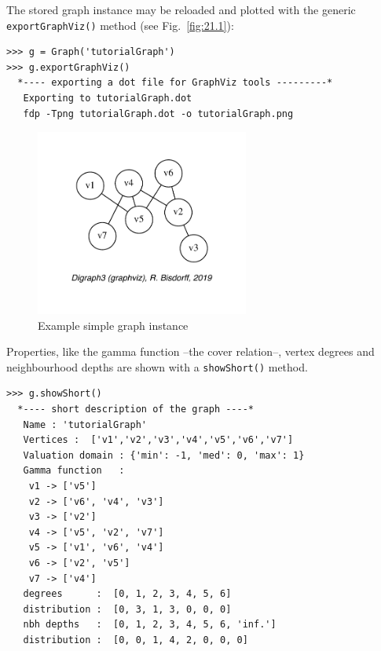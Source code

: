 The stored graph instance may be reloaded and plotted with the generic
\texttt{export\-GraphViz()} method (see Fig.~\vref{fig:21.1}):
\begin{lstlisting}
>>> g = Graph('tutorialGraph')
>>> g.exportGraphViz()
  *---- exporting a dot file for GraphViz tools ---------*
   Exporting to tutorialGraph.dot
   fdp -Tpng tutorialGraph.dot -o tutorialGraph.png
\end{lstlisting}
\begin{figure}[h]
\sidecaption[t]
\includegraphics[width=7cm]{Figures/21-1-tutorialGraph.pdf}
\caption{Example simple graph instance} 
\label{fig:21.1}       %
\end{figure}

Properties, like the gamma function --the cover relation--, vertex degrees and neighbourhood depths are shown with a \texttt{showShort()} method. 
\begin{lstlisting}[caption={Inspecting a graph instance},label=list:21.3]
>>> g.showShort()
  *---- short description of the graph ----*
   Name : 'tutorialGraph'
   Vertices :  ['v1','v2','v3','v4','v5','v6','v7']
   Valuation domain : {'min': -1, 'med': 0, 'max': 1}
   Gamma function   : 
    v1 -> ['v5']
    v2 -> ['v6', 'v4', 'v3']
    v3 -> ['v2']
    v4 -> ['v5', 'v2', 'v7']
    v5 -> ['v1', 'v6', 'v4']
    v6 -> ['v2', 'v5']
    v7 -> ['v4']
   degrees      :  [0, 1, 2, 3, 4, 5, 6]
   distribution :  [0, 3, 1, 3, 0, 0, 0]
   nbh depths   :  [0, 1, 2, 3, 4, 5, 6, 'inf.']
   distribution :  [0, 0, 1, 4, 2, 0, 0, 0]
\end{lstlisting}

